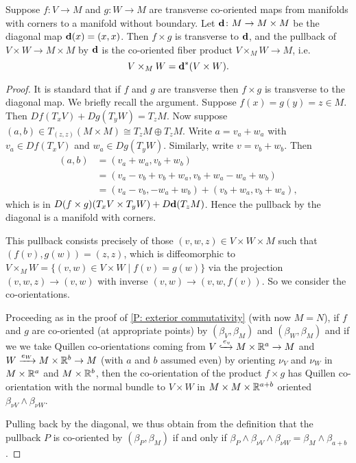 \begin{proposition}\label{P: cross to cup}
	Suppose $f \colon V \to M$ and $g \colon W \to M$ are transverse co-oriented maps from manifolds with corners to a manifold without boundary.
	Let $\mathbf{d} \colon M \to M \times M$ be the diagonal map $\mathbf{d}(x) = (x,x)$.
	Then $f \times g$ is transverse to $\mathbf{d}$, and the pullback of $V \times W \to M \times M$ by $\mathbf{d}$ is the co-oriented fiber product $V \times_M W \to M$, i.e.\ $$V \times_M W = \mathbf{d}^*(V \times W).$$
\end{proposition}
\begin{proof}
	It is standard that if $f$ and $g$ are transverse then $f \times g$ is transverse to the diagonal map.
	We briefly recall the argument.
	Suppose $f(x) = g(y) = z \in M$.
	Then $Df(T_xV)+Dg(T_yW) = T_zM$.
	Now suppose $(a,b) \in T_{(z,z)}(M \times M) \cong T_zM \oplus T_zM$.
	Write $a = v_a+w_a$ with $v_a \in Df(T_xV)$ and $w_a \in Dg(T_yW)$.
	Similarly, write $v = v_b+w_b$.
	Then
	\begin{align*}
		(a,b)& = (v_a+w_a,v_b+w_b)\\
		& = (v_a-v_b+v_b+w_a, v_b+w_a-w_a+w_b)\\
		& = (v_a-v_b,-w_a+w_b)+(v_b+w_a, v_b+w_a),
	\end{align*}
	which is in $D(f \times g)(T_xV \times T_yW)+D\mathbf{d}(T_zM)$.
	Hence the pullback by the diagonal is a manifold with corners.

	This pullback consists precisely of those $(v,w,z) \in V \times W \times M$ such that $(f(v),g(w)) = (z,z)$, which is diffeomorphic to $V \times_M W = \{(v,w) \in V \times W \mid f(v) = g(w)\}$ via the projection $(v,w,z) \to (v,w)$ with inverse $(v,w) \to (v,w,f(v))$.
	So we consider the co-orientations.

	Proceeding as in the proof of \cref{P: exterior commutativity} (with now $M = N$), if $f$ and $g$ are co-oriented (at appropriate points) by $(\beta_V,\beta_M)$ and $(\beta_W,\beta_M)$ and if we we take Quillen co-orientations coming from $V\xhookrightarrow{e_v} M \times \mathbb{R}^a \to M$ and $W\xrightarrow{e_W} M \times \mathbb{R}^b \to M$ (with $a$ and $b$ assumed even) by orienting $\nu_V$ and $\nu_W$ in $M \times \mathbb{R}^a$ and $M \times \mathbb{R}^b$, then the co-orientation of the product $f \times g$ has Quillen co-orientation with the normal bundle to $V \times W$ in $M \times M \times \mathbb{R}^{a+b}$ oriented $\beta_{\nu V} \wedge \beta_{\nu W}$.

	Pulling back by the diagonal, we thus obtain from the definition that the pullback $P$ is co-oriented by $(\beta_P,\beta_M)$ if and only if $\beta_P \wedge \beta_{\nu V} \wedge \beta_{\nu W} = \beta_M \wedge \beta_{a+b}$.


\end{proof}
